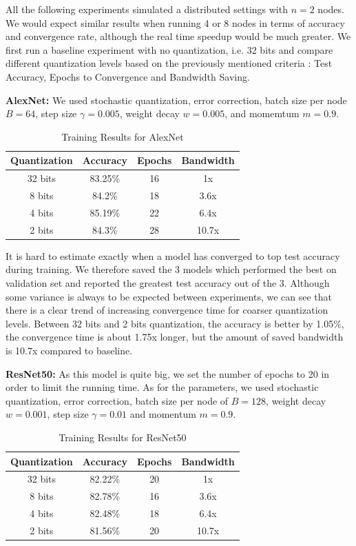 \documentclass[10pt,conference,compsocconf]{IEEEtran}
\begin{document}
All the following experiments simulated a distributed settings with $n = 2$ nodes. We would expect similar results when running 4 or 8 nodes in terms of accuracy and convergence rate, although the real time speedup would be much greater. We first run a baseline experiment with no quantization, i.e. 32 bits and compare different quantization levels based on the previously mentioned criteria : Test Accuracy, Epochs to Convergence and Bandwidth Saving.

\textbf{AlexNet:} We used stochastic quantization, error correction, batch size per node $B = 64$, step size $\gamma = 0.005$, weight decay $w = 0.005$, and momemtum $m = 0.9$. 

\begin{table}[htbp]
  \centering
  \begin{tabular}[c]{|c||c|c|c|}
    \hline
	  Quantization&Accuracy&Epochs&Bandwidth\\
    \hline
	  32 bits&83.25\% &16&1x\\
	  8 bits&84.2\%&18&3.6x\\
	  4 bits&85.19\%&22&6.4x\\
	  2 bits&84.3\%&28&10.7x\\
    \hline
  \end{tabular}
	\vspace{0.7em}
	\caption{Training Results for AlexNet}
\end{table}

\vspace{-1.5em}
\noindent It is hard to estimate exactly when a model has converged to top test accuracy during training. We therefore saved the 3 models which performed the best on validation set and reported the greatest test accuracy out of the 3. Although some variance is always to be expected between experiments, we can see that there is a clear trend of increasing convergence time for coarser quantization levels. Between 32 bits and 2 bits quantization, the accuracy is better by 1.05\%, the convergence time is about 1.75x longer, but the amount of saved bandwidth is 10.7x compared to baseline.
\vspace{0.3em}


\textbf{ResNet50:} As this model is quite big, we set the number of epochs to 20 in order to limit the running time. As for the parameters, we used stochastic quantization, error correction, batch size per node of $B = 128$, weight decay $w = 0.001$, step size $\gamma = 0.01$ and momentum $m = 0.9$.
\begin{table}[htbp]
  \centering
  \begin{tabular}[c]{|c||c|c|c|}
    \hline
          Quantization&Accuracy&Epochs&Bandwidth\\
    \hline
          32 bits&82.22\% &20&1x\\
          8 bits&82.78\%&16&3.6x\\
          4 bits&82.48\%&18&6.4x\\
          2 bits&81.56\%&20&10.7x\\
    \hline
  \end{tabular}
        \vspace{0.7em}
        \caption{Training Results for ResNet50}
\end{table}
\end{document}
